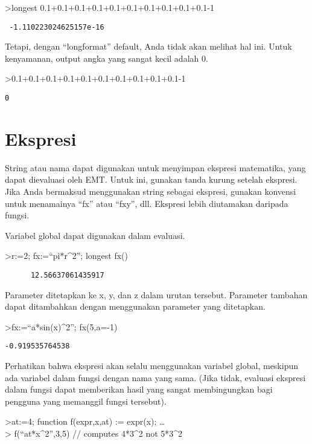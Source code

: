 \documentclass[
]{book}
\begin{document}
\textgreater longest 0.1+0.1+0.1+0.1+0.1+0.1+0.1+0.1+0.1+0.1-1

\begin{verbatim}
 -1.110223024625157e-16 
\end{verbatim}

Tetapi, dengan ``longformat'' default, Anda tidak akan melihat hal ini. Untuk kenyamanan, output angka yang sangat kecil adalah 0.

\textgreater0.1+0.1+0.1+0.1+0.1+0.1+0.1+0.1+0.1+0.1-1

\begin{verbatim}
0
\end{verbatim}

\chapter{Ekspresi}\label{ekspresi}

String atau nama dapat digunakan untuk menyimpan ekspresi matematika, yang dapat dievaluasi oleh EMT. Untuk ini, gunakan tanda kurung setelah ekspresi. Jika Anda bermaksud menggunakan string sebagai ekspresi, gunakan konvensi untuk menamainya ``fx'' atau ``fxy'', dll. Ekspresi lebih diutamakan daripada fungsi.

Variabel global dapat digunakan dalam evaluasi.

\textgreater r:=2; fx:=``pi*r\^{}2''; longest fx()

\begin{verbatim}
      12.56637061435917 
\end{verbatim}

Parameter ditetapkan ke x, y, dan z dalam urutan tersebut. Parameter tambahan dapat ditambahkan dengan menggunakan parameter yang ditetapkan.

\textgreater fx:=``a*sin(x)\^{}2''; fx(5,a=-1)

\begin{verbatim}
-0.919535764538
\end{verbatim}

Perhatikan bahwa ekspresi akan selalu menggunakan variabel global, meskipun ada variabel dalam fungsi dengan nama yang sama. (Jika tidak, evaluasi ekspresi dalam fungsi dapat memberikan hasil yang sangat membingungkan bagi pengguna yang memanggil fungsi tersebut).

\textgreater at:=4; function f(expr,x,at) := expr(x); \ldots{}\\
\textgreater{} f(``at*x\^{}2'',3,5) // computes 4*3\^{}2 not 5*3\^{}2
\end{document}
